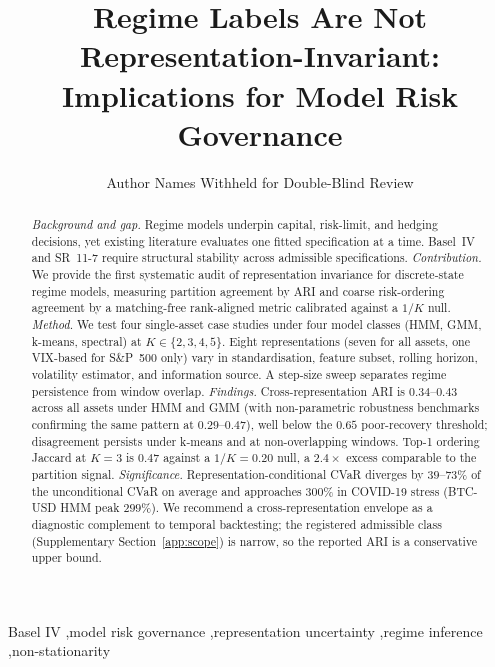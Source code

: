 \documentclass[preprint,12pt,authoryear]{elsarticle}
\begin{document}
\begin{frontmatter}
\sloppy

\title{Regime Labels Are Not Representation-Invariant:\\ Implications for Model Risk Governance}

\author[1]{Author Names Withheld for Double-Blind Review}

\begin{abstract}
\textit{Background and gap.} Regime models underpin capital, risk-limit, and hedging decisions, yet existing literature evaluates one fitted specification at a time. Basel~IV and SR~11-7 require structural stability across admissible specifications.
\textit{Contribution.} We provide the first systematic audit of representation invariance for discrete-state regime models, measuring partition agreement by ARI and coarse risk-ordering agreement by a matching-free rank-aligned metric calibrated against a $1/K$ null.
\textit{Method.} We test four single-asset case studies under four model classes (HMM, GMM, k-means, spectral) at $K\in\{2,3,4,5\}$. Eight representations (seven for all assets, one VIX-based for S\&P~500 only) vary in standardisation, feature subset, rolling horizon, volatility estimator, and information source. A step-size sweep separates regime persistence from window overlap.
\textit{Findings.} Cross-representation ARI is $0.34$--$0.43$ across all assets under HMM and GMM (with non-parametric robustness benchmarks confirming the same pattern at $0.29$--$0.47$), well below the $0.65$ poor-recovery threshold; disagreement persists under k-means and at non-overlapping windows. Top-1 ordering Jaccard at $K=3$ is $0.47$ against a $1/K=0.20$ null, a $2.4\times$ excess comparable to the partition signal.
\textit{Significance.} Representation-conditional CVaR diverges by $39$--$73\%$ of the unconditional CVaR on average and approaches $300\%$ in COVID-19 stress (BTC-USD HMM peak $299\%$). We recommend a cross-representation envelope as a diagnostic complement to temporal backtesting; the registered admissible class (Supplementary Section~\ref{app:scope}) is narrow, so the reported ARI is a conservative upper bound.
\end{abstract}

\begin{keyword}
Basel IV \sep model risk governance \sep representation uncertainty \sep regime inference \sep non-stationarity
\end{keyword}

\end{frontmatter}
\sloppy
\end{document}
